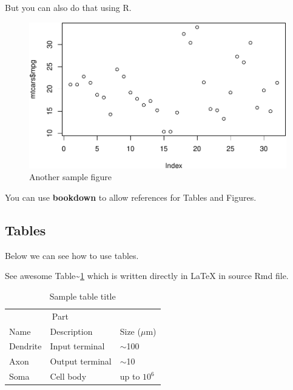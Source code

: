 \documentclass{article}
\newenvironment{Shaded}{\begin{snugshade}}{\end{snugshade}}
\newcommand{\FunctionTok}[1]{\textcolor[rgb]{0.13,0.29,0.53}{\textbf{#1}}}
\newcommand{\NormalTok}[1]{#1}
\newcommand{\SpecialCharTok}[1]{\textcolor[rgb]{0.81,0.36,0.00}{\textbf{#1}}}
\begin{document}
But you can also do that using R.

\begin{Shaded}
\end{Shaded}

\begin{figure}
\centering
\includegraphics{paper_files/figure-latex/fig2-1.pdf}
\caption{Another sample figure}
\end{figure}

You can use \textbf{bookdown} to allow references for Tables and
Figures.

\hypertarget{tables}{%
\subsection{Tables}\label{tables}}

Below we can see how to use tables.

See awesome Table\textasciitilde{}\ref{tab:table} which is written
directly in LaTeX in source Rmd file.

\begin{table}
 \caption{Sample table title}
  \centering
  \begin{tabular}{lll}
    \toprule
    \multicolumn{2}{c}{Part}                   \\
    \cmidrule(r){1-2}
    Name     & Description     & Size ($\mu$m) \\
    \midrule
    Dendrite & Input terminal  & $\sim$100     \\
    Axon     & Output terminal & $\sim$10      \\
    Soma     & Cell body       & up to $10^6$  \\
    \bottomrule
  \end{tabular}
  \label{tab:table}
\end{table}
\end{document}
